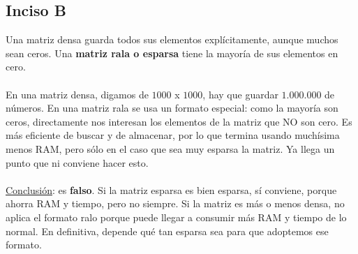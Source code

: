 \documentclass{article}
\begin{document}
        \subsection*{Inciso B}
            Una matriz densa guarda todos sus elementos explícitamente, aunque muchos sean ceros. Una \textbf{matriz rala o esparsa} tiene la mayoría de sus elementos en cero. \\
            \\
            En una matriz densa, digamos de $1000$ x $1000$, hay que guardar $1.000.000$ de números. En una matriz rala se usa un formato especial: como la mayoría son ceros, directamente nos interesan los elementos de la matriz que NO son cero. Es más eficiente de buscar y de almacenar, por lo que termina usando muchísima menos RAM, pero sólo en el caso que sea muy esparsa la matriz. Ya llega un punto que ni conviene hacer esto. \\
            \\
            \underline{Conclusión}: es \textbf{falso}. Si la matriz esparsa es bien esparsa, sí conviene, porque ahorra RAM y tiempo, pero no siempre. Si la matriz es más o menos densa, no aplica el formato ralo porque puede llegar a consumir más RAM y tiempo de lo normal. En definitiva, depende qué tan esparsa sea para que adoptemos ese formato.
\end{document}
